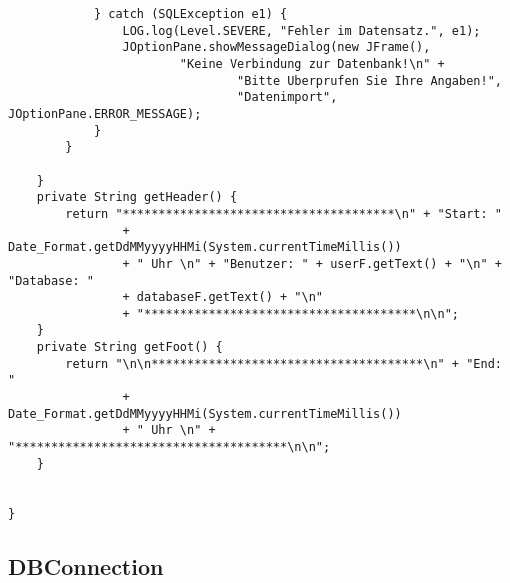 \begin{lstlisting}
			} catch (SQLException e1) {
				LOG.log(Level.SEVERE, "Fehler im Datensatz.", e1);
				JOptionPane.showMessageDialog(new JFrame(),
						"Keine Verbindung zur Datenbank!\n" +
								"Bitte Uberprufen Sie Ihre Angaben!",
								"Datenimport", JOptionPane.ERROR_MESSAGE);
			}
		}

	}
	private String getHeader() {
		return "**************************************\n" + "Start: "
				+ Date_Format.getDdMMyyyyHHMi(System.currentTimeMillis())
				+ " Uhr \n" + "Benutzer: " + userF.getText() + "\n" + "Database: "
				+ databaseF.getText() + "\n"
				+ "**************************************\n\n";
	}
	private String getFoot() {
		return "\n\n**************************************\n" + "End: "
				+ Date_Format.getDdMMyyyyHHMi(System.currentTimeMillis())
				+ " Uhr \n" + "**************************************\n\n";
	}


}

\end{lstlisting}

\subsection{DBConnection}

